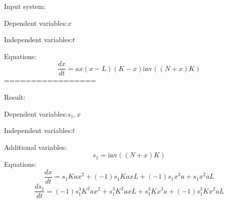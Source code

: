 \documentclass[10pt,a4paper]{article}
\begin{document}
Input system:

Dependent variables:$x$

Independent variables:$t$

Equations:
\begin{dmath*}\frac{dx}{dt} = a  x  \left(x - L\right)  \left(K - x\right)  \text{inv}\left(\left(N + x\right)  K\right)\end{dmath*}
=================

Result:

Dependent variables:$s_{1}, x$

Independent variables:$t$

Additional variables:
\begin{dmath*}s_{1} = \text{inv}\left(\left(N + x\right)  K\right)\end{dmath*}
Equations:
\begin{dmath*}\frac{dx}{dt} = s_{1}  K  a  x ^ {2} + \left(-1\right)  s_{1}  K  a  x  L + \left(-1\right)  s_{1}  x ^ {3}  a + s_{1}  x ^ {2}  a  L\end{dmath*}
\begin{dmath*}\frac{ds_{1}}{dt} = \left(-1\right)  s_{1} ^ {3}  K ^ {2}  a  x ^ {2} + s_{1} ^ {3}  K ^ {2}  a  x  L + s_{1} ^ {3}  K  x ^ {3}  a + \left(-1\right)  s_{1} ^ {3}  K  x ^ {2}  a  L\end{dmath*}
\end{document}

